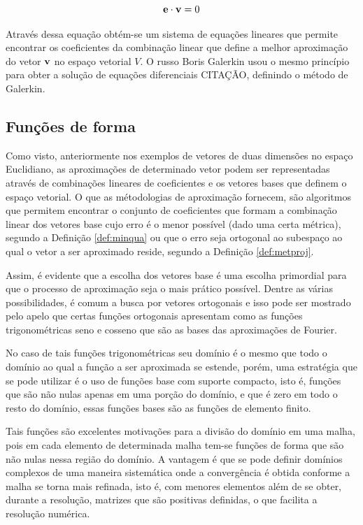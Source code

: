   $$ \bm{\mathrm{e}} \cdot \bm{\mathrm{v}} = 0$$
  
  Através dessa equação obtém-se um sistema de equações lineares que permite
  encontrar os coeficientes da combinação linear que define a melhor aproximação
  do vetor $\bm{\mathrm{v}}$ no espaço vetorial $V$. O russo Boris Galerkin usou o mesmo
  princípio para obter a solução de equações diferenciais CITAÇÃO, definindo o
  método de Galerkin.
  
	\subsection{Funções de forma}
	Como visto, anteriormente nos exemplos de vetores de duas dimensões no espaço
  Euclidiano, as aproximações de determinado vetor podem ser representadas
  através de combinações lineares de coeficientes e os vetores bases que definem
  o espaço vetorial. O que as métodologias de aproximação fornecem, são
  algoritmos que permitem encontrar o conjunto de coeficientes que formam a
  combinação linear dos vetores base cujo erro é o menor possível (dado uma
  certa métrica), segundo a Definição \ref{def:minqua} ou que o erro seja
  ortogonal ao subespaço ao qual o vetor a ser aproximado reside, segundo a
  Definição \ref{def:metproj}.

  Assim, é evidente que a escolha dos vetores base é uma escolha primordial para
  que o processo de aproximação seja o mais prático possível. Dentre as várias
  possibilidades, é comum a busca por vetores ortogonais e isso pode ser
  mostrado pelo apelo que certas funções ortogonais apresentam como as funções
  trigonométricas seno e cosseno que são as bases das aproximações de Fourier.

  No caso de tais funções trigonométricas seu domínio é o mesmo que todo o
  domínio ao qual a função a ser aproximada se estende, porém, uma estratégia
  que se pode utilizar é o uso de funções base com suporte compacto, isto é,
  funções que são não nulas apenas em uma porção do domínio, e que é zero em
  todo o resto do domínio, essas funções bases são as funções de elemento finito.

  Tais funções são excelentes motivações para a divisão do domínio em uma malha,
  pois em cada elemento de determinada malha tem-se funções de forma que são não
  nulas nessa região do domínio. A vantagem é que se pode definir domínios
  complexos de uma maneira sistemática onde a convergência é obtida conforme a
  malha se torna mais refinada, isto é, com menores elementos além de se obter,
  durante a resolução, matrizes que são positivas definidas, o que facilita a
  resolução numérica.

